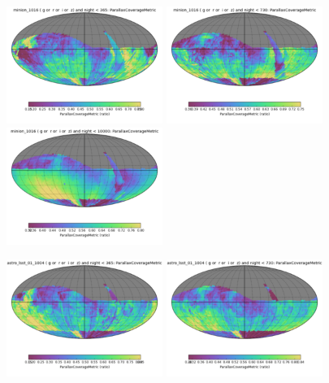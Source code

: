 \begin{figure}[ht]
  \begin{center}
  \includegraphics[width=2.0in]{./figs/milkyway/astromPanels/MW_Astrom_paCovge_Baseline_01y_map.png}
  \includegraphics[width=2.0in]{./figs/milkyway/astromPanels/MW_Astrom_paCovge_Baseline_02y_map.png}
  \includegraphics[width=2.0in]{./figs/milkyway/astromPanels/MW_Astrom_paCovge_Baseline_10y_map.png}
  \end{center}
  \begin{center}
  \includegraphics[width=2.0in]{./figs/milkyway/astromPanels/MW_Astrom_paCovge_wfdPlane_01y_map.png}
  \includegraphics[width=2.0in]{./figs/milkyway/astromPanels/MW_Astrom_paCovge_wfdPlane_02y_map.png}

\end{center}
\end{figure}
